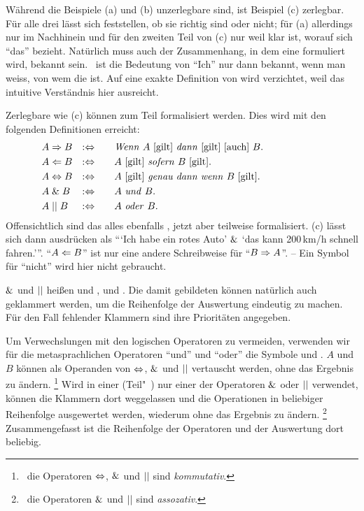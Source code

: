 Während die Beispiele (a) und (b) unzerlegbare  sind, ist Beispiel (c) zerlegbar.
Für alle drei  lässt sich feststellen, ob sie richtig sind oder nicht;
für (a) allerdings nur im Nachhinein und für den zweiten Teil von (c) nur weil klar ist, worauf sich \enquote{das} bezieht.
Natürlich muss auch der Zusammenhang, in dem eine  formuliert wird, bekannt sein.
\textZB\ ist die Bedeutung von \enquote{Ich} nur dann bekannt, wenn man weiss, von wem die  ist.
Auf eine exakte Definition von  wird verzichtet, weil das intuitive Verständnis hier ausreicht.

Zerlegbare  wie (c) können zum Teil formalisiert werden.
Dies wird mit den folgenden Definitionen erreicht:
%
\begin{align}
	& A \Rightarrow   B & :\Leftrightarrow & \qquad
	\text{\emph{Wenn} $A$ [gilt] \emph{dann} [gilt] [auch] $B$.}
	\\
	& A \Leftarrow   B & :\Leftrightarrow & \qquad
	\text{$A$ [gilt] \emph{sofern}          $B$ [gilt].}
	\\
	& A \Leftrightarrow B & :\Leftrightarrow & \qquad
	\text{$A$ [gilt] \emph{genau dann wenn} $B$ [gilt].}
	\\
	& A \;\&\;   B & :\Leftrightarrow & \qquad
	\text{$A$ \emph{und}  $B$.}
	\\
	& A \;||\;    B & :\Leftrightarrow & \qquad
	\text{$A$ \emph{oder} $B$.}
	&&&&&&&&&&
\end{align}
%
Offensichtlich sind das alles ebenfalls , jetzt aber teilweise formalisiert.
(c) lässt sich dann ausdrücken als \enquote{\enquote{Ich habe ein rotes Auto} $\metaandsym$ \enquote{das kann 200\,km/h schnell fahren.}}.
\enquote{$A \Leftarrow B$} ist nur eine andere Schreibweise für \enquote{$B \Rightarrow A$}.
-- Ein Symbol für \enquote{nicht} wird hier nicht gebraucht.

$\metaandsym$\hidden{\glsIdxPl{\metaand}} und $\metaorsym$\hidden{\glsIdxPl{\metaor}} heißen \emph{} und ,  und  \emph{}.
Die damit gebildeten  können natürlich auch geklammert werden, um die Reihenfolge der Auswertung eindeutig zu machen.
Für den Fall fehlender Klammern sind ihre Prioritäten  angegeben.

Um Verwechslungen mit den logischen Operatoren zu vermeiden, verwenden wir für die metasprachlichen Operatoren \enquote{und} und \enquote{oder} die Symbole \chrqt{$\metaandsym$} und \chrqt{$\metaorsym$}.
$A$ und $B$ können als Operanden von $\Leftrightarrow$, $\metaandsym$ und $\metaorsym$ vertauscht werden, ohne das Ergebnis zu ändern.%
\footnote{%
	\textDh\ die Operatoren $\Leftrightarrow$, $\metaandsym$ und $\metaorsym$ sind \emph{kommutativ}.
}
Wird in einer (Teil"~) nur einer der Operatoren $\metaandsym$ oder $\metaorsym$ verwendet, können die Klammern dort weggelassen und die Operationen in beliebiger Reihenfolge ausgewertet werden, wiederum ohne das Ergebnis zu ändern.%
\footnote{%
	\textDh\ die Operatoren $\metaandsym$ und $\metaorsym$ sind \emph{assozativ}.
}
Zusammengefasst ist die Reihenfolge der Operatoren und der Auswertung dort beliebig.

